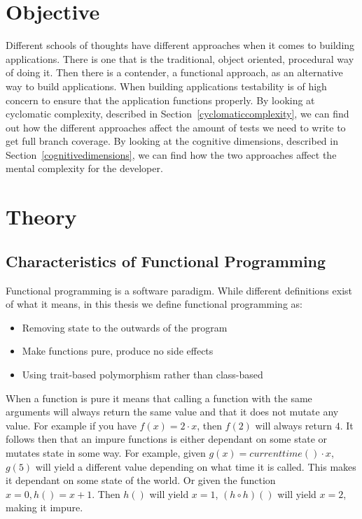 \documentclass[12pt]{article}
\theoremstyle{definition}
\theoremstyle{theorem}
\begin{document}
\section{Objective}

Different schools of thoughts have different approaches when it comes to
building applications. There is one that is the traditional, object oriented,
procedural way of doing it. Then there is a contender, a functional approach, as
an alternative way to build applications. When building applications testability
is of high concern to ensure that the application functions properly. By looking
at cyclomatic complexity, described in Section~\ref{cyclomaticcomplexity}, we
can find out how the different approaches affect the amount of tests we need to
write to get full branch coverage. By looking at the cognitive dimensions,
described in Section~\ref{cognitivedimensions}, we can find how the two
approaches affect the mental complexity for the developer. 


\section{Theory}\label{theory}

\subsection{Characteristics of Functional Programming}

Functional programming is a software paradigm. While different definitions exist
of what it means, in this thesis we define functional programming as:

\begin{itemize}
    \item Removing state to the outwards of the program
    \item Make functions pure, produce no side effects
    \item Using trait-based polymorphism rather than class-based
\end{itemize}

When a function is pure it means that calling a function with the same arguments
will always return the same value and that it does not mutate any value. For
example if you have $f(x) = 2\cdot x$, then $f(2)$ will always return $4$. It
follows then that an impure functions is either dependant on some state or
mutates state in some way. For example, given $g(x) = currenttime() \cdot x$,
$g(5)$ will yield a different value depending on what time it is called. This
makes it dependant on some state of the world. Or given the function $x=0, h() =
x+1$. Then $h()$ will yield $x=1$, $(h \circ h)()$ will yield $x=2$, making it
impure.~\cite{wikipedia_pure}
\end{document}
